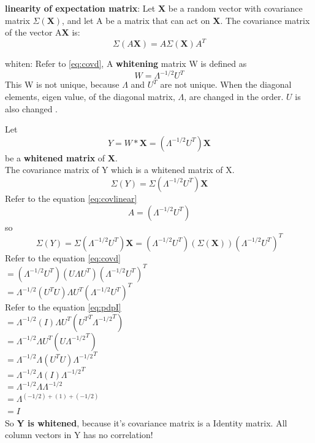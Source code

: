 \documentclass[a4paper,12pt]{article}
\begin{document}
\begin{compactitem}
\textbf{linearity of expectation matrix}: Let \textbf{X} be a random vector with covariance matrix
$\Sigma(\textbf{X})$, and let A be a matrix that can act on \textbf{X}. The covariance matrix of the vector A\textbf{X} is:
\begin{equation}
\label{eq:covlinear}
\Sigma(A\textbf{X}) = A\Sigma(\textbf{X})A^{T}
\end{equation}

\item whiten: Refer to \eqref{eq:covd},  A \textbf{whitening} matrix W is defined as
\begin{equation}
\label{eq:whitem}
W=\Lambda^{-1/2} U^{T}
\end{equation}
This W is not unique, because $\Lambda$ and $U^T$ are not unique.
When the diagonal elements, eigen value, of the diagonal matrix, $\Lambda$, are changed in the order.
$U$ is also changed .

Let
\begin{equation}
\label{eq:whitened}
Y = W*\textbf{X}= (\Lambda^{-1/2} U^{T}) \textbf{X}
\end{equation}
be a \textbf{whitened matrix} of \textbf{X}.\\
The covariance matrix of Y which is a whitened matrix of X.
\[
\Sigma (Y)=\Sigma (\Lambda^{-1/2} U^{T}) \textbf{X}
\]
Refer to the equation \eqref{eq:covlinear}
\[
A=(\Lambda^{-1/2} U^{T})
\]
so
\[
\Sigma (Y)=\Sigma (\Lambda^{-1/2} U^{T}) \textbf{X}=
(\Lambda^{-1/2} U^{T})(\Sigma (\textbf{X})) (\Lambda^{-1/2} U^{T})^{T}
\]
Refer to the equation \eqref{eq:covd}\\
$=(\Lambda^{-1/2} U^{T}) (U \Lambda U^{T}) (\Lambda^{-1/2} U^{T}) ^T$\\
$=\Lambda^{-1/2} (U^{T}  U) \Lambda U^{T} (\Lambda^{-1/2} U^{T}) ^T$\\
Refer to the equation \eqref{eq:pdpI}\\
$=\Lambda^{-1/2} (I) \Lambda U^{T} ({U^{T}}^T{\Lambda^{-1/2}}^T)$\\
$=\Lambda^{-1/2} \Lambda U^{T} (U{\Lambda^{-1/2}}^T)$\\
$=\Lambda^{-1/2} \Lambda (U^{T} U) {\Lambda^{-1/2}}^T$\\
$=\Lambda^{-1/2} \Lambda (I) {\Lambda^{-1/2}}^T$\\
$=\Lambda^{-1/2} \Lambda \Lambda^{-1/2}$\\
$=\Lambda^{(-1/2) + (1) + (-1/2)}$\\
$=I$\\
So \textbf{Y is whitened}, because it's covariance matrix is a Identity matrix.
All column vectors in Y has no correlation!

\end{compactitem}
\end{document}
